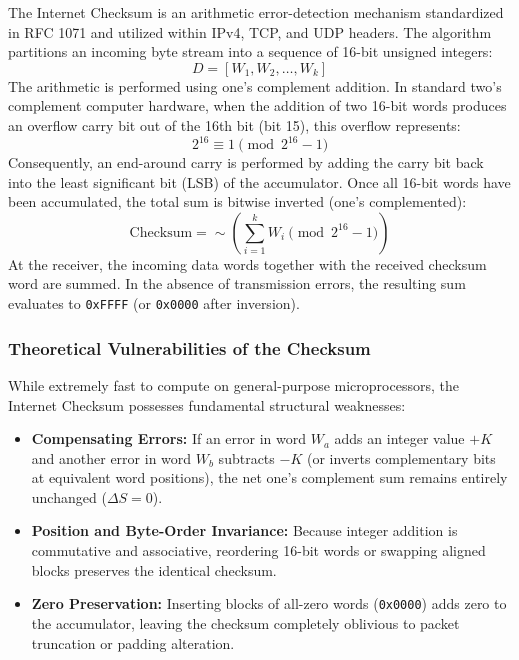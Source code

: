 \documentclass[11pt,a4paper]{article}
\begin{document}
The Internet Checksum is an arithmetic error-detection mechanism standardized in RFC 1071 and utilized within IPv4, TCP, and UDP headers. The algorithm partitions an incoming byte stream into a sequence of 16-bit unsigned integers:
\begin{equation}
    D = [W_1, W_2, \dots, W_k]
\end{equation}
The arithmetic is performed using one's complement addition. In standard two's complement computer hardware, when the addition of two 16-bit words produces an overflow carry bit out of the 16th bit (bit 15), this overflow represents:
\begin{equation}
    2^{16} \equiv 1 \pmod{2^{16} - 1}
\end{equation}
Consequently, an end-around carry is performed by adding the carry bit back into the least significant bit (LSB) of the accumulator. Once all 16-bit words have been accumulated, the total sum is bitwise inverted (one's complemented):
\begin{equation}
    \text{Checksum} = \sim \left( \sum_{i=1}^{k} W_i \pmod{2^{16} - 1} \right)
\end{equation}
At the receiver, the incoming data words together with the received checksum word are summed. In the absence of transmission errors, the resulting sum evaluates to \texttt{0xFFFF} (or \texttt{0x0000} after inversion).

\subsubsection{Theoretical Vulnerabilities of the Checksum}
While extremely fast to compute on general-purpose microprocessors, the Internet Checksum possesses fundamental structural weaknesses:
\begin{itemize}
    \item \textbf{Compensating Errors:} If an error in word $W_a$ adds an integer value $+K$ and another error in word $W_b$ subtracts $-K$ (or inverts complementary bits at equivalent word positions), the net one's complement sum remains entirely unchanged ($\Delta S = 0$).
    \item \textbf{Position and Byte-Order Invariance:} Because integer addition is commutative and associative, reordering 16-bit words or swapping aligned blocks preserves the identical checksum.
    \item \textbf{Zero Preservation:} Inserting blocks of all-zero words (\texttt{0x0000}) adds zero to the accumulator, leaving the checksum completely oblivious to packet truncation or padding alteration.
\end{itemize}
\end{document}
